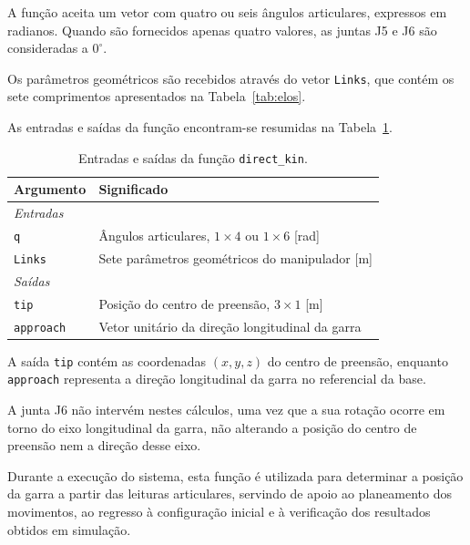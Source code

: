 A função aceita um vetor com quatro ou seis ângulos articulares, expressos em radianos. Quando são fornecidos apenas quatro valores, as juntas J5 e J6 são consideradas a $0^\circ$.

Os parâmetros geométricos são recebidos através do vetor \texttt{Links}, que contém os sete comprimentos apresentados na Tabela~\ref{tab:elos}.

As entradas e saídas da função encontram-se resumidas na Tabela~\ref{tab:direct_io}.

\begin{table}[H]
    \centering
    \caption{Entradas e saídas da função \texttt{direct\_kin}.}
    \label{tab:direct_io}
    \begin{tabular}{ll}
        \toprule
        Argumento & Significado \\
        \midrule
        \multicolumn{2}{l}{\textit{Entradas}} \\
        \texttt{q}
        & Ângulos articulares, $1\times4$ ou $1\times6$ [rad] \\
        \texttt{Links}
        & Sete parâmetros geométricos do manipulador [m] \\
        \midrule
        \multicolumn{2}{l}{\textit{Saídas}} \\
        \texttt{tip}
        & Posição do centro de preensão, $3\times1$ [m] \\
        \texttt{approach}
        & Vetor unitário da direção longitudinal da garra \\
        \bottomrule
    \end{tabular}
\end{table}

A saída \texttt{tip} contém as coordenadas $(x,y,z)$ do centro de preensão, enquanto \texttt{approach} representa a direção longitudinal da garra no referencial da base.

A junta J6 não intervém nestes cálculos, uma vez que a sua rotação ocorre em torno do eixo longitudinal da garra, não alterando a posição do centro de preensão nem a direção desse eixo.

Durante a execução do sistema, esta função é utilizada para determinar a posição da garra a partir das leituras articulares, servindo de apoio ao planeamento dos movimentos, ao regresso à configuração inicial e à verificação dos resultados obtidos em simulação.
